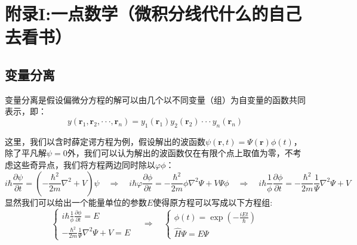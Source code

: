 \section{附录I:一点数学（微积分线代什么的自己去看书）}
\subsection{变量分离}
变量分离是假设偏微分方程的解可以由几个以不同变量（组）为自变量的函数共同表示，即：
\[y(\bm{r}_1,\bm{r}_2,\cdot\cdot\cdot,\bm{r}_n)=y_1(\bm{r}_1)y_2(\bm{r}_2)\cdot\cdot\cdot y_n(\bm{r}_n)\]

这里，我们以含时薛定谔方程为例，假设解出的波函数$\psi(\bm{r},t)=\varPsi(\bm{r})\phi(t)$，除了平凡解$\psi=0$外，我们可以认为解出的波函数仅在有限个点上取值为零，不考虑这些奇异点，我们将方程两边同时除以$\varphi\phi$：
\[i \hbar \frac{\partial \psi}{\partial t}=\left (-\frac{\hbar^2}{2m}\nabla^2+V \right ) \psi \quad \Rightarrow \quad i \hbar \varphi \frac{\partial \phi}{\partial t}= -\frac{\hbar^2}{2m} \phi \nabla^2 \varPsi+V\varPsi\phi \quad \Rightarrow \quad i \hbar \frac{1}{\phi} \frac{\partial \phi}{\partial t}= -\frac{\hbar^2}{2m} \frac{1}{\varPsi} \nabla^2 \varPsi+V\]
显然我们可以给出一个能量单位的参数$E$使得原方程可以写成以下方程组:
\[\left\{
\begin{array}{r}
i\hbar\frac{1}{\phi}\frac{\partial\phi}{\partial t}=E\\
-\frac{\hbar^2}{2m}\frac{1}{\varPsi}\nabla^2\varPsi+V=E
\end{array} \right. \quad \Rightarrow \quad
\left\{
\begin{array}{l}
\phi(t)=\exp(-\frac{iEt}{\hbar})\\
\hat{H}\varPsi=E\varPsi
\end{array} \right.\]

